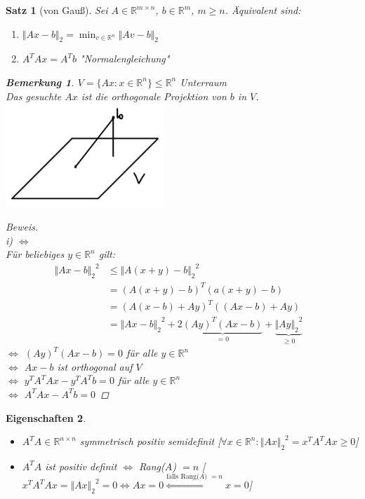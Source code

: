 \documentclass[12pt]{article}
\theoremstyle{break}
\newtheorem{theorem}{Satz}[subsection]
\newtheorem*{comment*}{Bemerkung}
\newtheorem{properties}[theorem]{Eigenschaften}
\begin{document}
\begin{theorem}[von Gauß]
Sei $A \in \mathbb{R}^{m \times n}$, $b \in \mathbb{R}^m$, $m \geq n$. Äquivalent sind:
\renewcommand{\labelenumi}{\roman{enumi})}
\begin{enumerate}
  \item $\Vert Ax - b \Vert_2 = \min_{v \in \mathbb{R}^n} \Vert Av - b \Vert_2$
  \item $A^TAx = A^Tb$ "Normalengleichung"
\end{enumerate}

\begin{comment*}
$V = \{Ax: x \in \mathbb{R}^n \} \leq \mathbb{R}^n$ Unterraum\\
Das gesuchte $Ax$ ist die orthogonale Projektion von $b$ in $V$.\\
\includegraphics[width=6cm]{Bild7.png}
\end{comment*}
\begin{proof}[Beweis]\leavevmode \\
i) $\Leftrightarrow$ \\
Für beliebiges $y \in \mathbb{R}^n$ gilt:
\begin{align*}
{\Vert Ax - b \Vert_2}^2 &\leq {\Vert A(x+y) - b \Vert_2}^2 &\\
&= (A(x+y)-b)^T(a(x+y)-b) &\\
&= (A(x-b)+Ay)^T((Ax-b) + Ay) &\\
&= {\Vert Ax - b \Vert_2}^2 + 2\underbrace{(Ay)^T (Ax-b)}_{=0} + \underbrace{{\Vert Ay \Vert_2}^2}_{\geq 0} 
\end{align*}
$\Leftrightarrow$ $(Ay)^T(Ax-b) = 0$ für alle $y \in \mathbb{R}^n$ \\
$\Leftrightarrow$ $Ax-b$ ist orthogonal auf $V$ \\
$\Leftrightarrow$ $y^TA^TAx -y^TA^Tb = 0$ für alle $y \in \mathbb{R}^n$ \\
$\Leftrightarrow$ $A^TAx - A^Tb = 0$ 
\end{proof}
\end{theorem}

\begin{properties}\leavevmode
\begin{itemize}
  \item $A^TA \in \mathbb{R}^{n \times n}$ symmetrisch positiv semidefinit [$\forall x \in \mathbb{R}^n: {\Vert Ax \Vert_2}^2 = x^TA^TAx \geq 0$]
  \item $A^TA$ ist positiv definit $\Leftrightarrow$ Rang($A$) $= n$  [$x^TA^TAx = {\Vert Ax \Vert_2}^2 = 0 \Leftrightarrow Ax = 0 \overset{\text{falls Rang($A$) $=n$}}{ \Leftrightarrow} x = 0$]
\end{itemize}
\end{properties}
\end{document}
